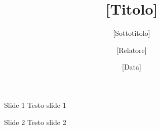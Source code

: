 \documentclass[presentation]{beamer}
\author{{[}Relatore]}
\date{{[}Data]}
\title{{[}Titolo]}
\subtitle{{[}Sottotitolo]}
\begin{document}
\maketitle
\begin{frame}[label={sec:orgb4d360a}]{Slide 1}
Testo slide 1
\end{frame}
\begin{frame}[label={sec:org60bd18f}]{Slide 2}
Testo slide 2
\end{frame}
\end{document}
